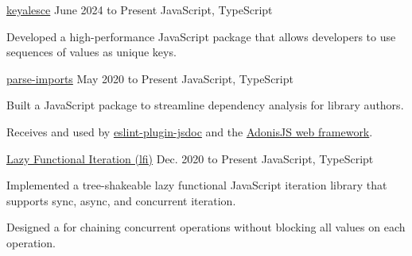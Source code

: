 
\begin{cventry}
    {\href{https://github.com/TomerAberbach/keyalesce}{keyalesce}}{}
    {June 2024 to Present}
    {JavaScript, TypeScript}
    \begin{cvitems}
        \item Developed a high-performance JavaScript package that allows developers to use sequences of values as unique keys.
    \end{cvitems}
\end{cventry}

\begin{cventry}
    {\href{https://github.com/TomerAberbach/parse-imports}{parse-imports}}{}
    {May 2020 to Present}
    {JavaScript, TypeScript}
    \begin{cvitems}
        \item Built a JavaScript package to streamline dependency analysis for library authors.
        \item Receives  and used by \href{https://github.com/gajus/eslint-plugin-jsdoc}{eslint-plugin-jsdoc} and the \href{https://adonisjs.com}{AdonisJS web framework}.
    \end{cvitems}
\end{cventry}

\begin{cventry}
    {\href{https://github.com/TomerAberbach/lfi}{Lazy Functional Iteration (lfi)}}{}
    {Dec. 2020 to Present}
    {JavaScript, TypeScript}
    \begin{cvitems}
        \item Implemented a tree-shakeable lazy functional JavaScript iteration library that supports sync, async, and concurrent iteration.
        \item Designed a  for chaining concurrent operations without blocking all values on each operation.
    \end{cvitems}
\end{cventry}
